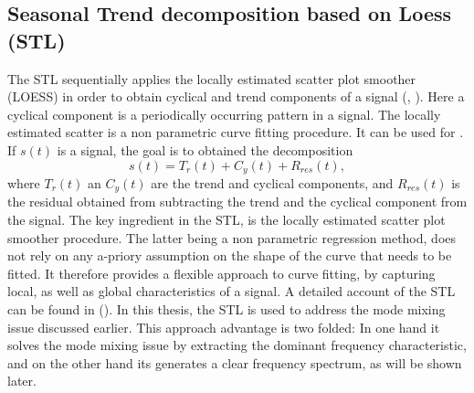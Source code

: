 \documentclass[../Main/thesis.tex]{subfiles}
\begin{document}
\justify
\subsection{Seasonal Trend decomposition based on Loess (STL)}
The STL sequentially applies the locally estimated scatter plot smoother (LOESS) in order to obtain cyclical and trend components of a signal (\cite{Cleveland-1979}, \cite{Cleveland-et-al-1988}). Here a cyclical component is a periodically occurring pattern in a signal. The  locally estimated scatter is a non parametric curve fitting procedure.  It can be used for .
If $s(t)$ is a signal, the goal is to obtained the decomposition 
\begin{equation}
s(t) = T_{r}(t) + C_{y}(t) + R_{res}(t),
\end{equation} 
where $T_{r}(t)$ an $C_{y}(t)$ are the trend and cyclical components, and $R_{res}(t)$ is the residual obtained from subtracting  the trend and the cyclical component from the signal. The key ingredient in the STL, is the locally estimated scatter plot smoother procedure. The latter being a non parametric regression method, does not rely on any a-priory assumption on the shape of the curve that needs to be fitted. It therefore provides a flexible approach to curve fitting, by capturing local, as well as global characteristics of a signal. A detailed account of the STL can be found in  (\cite{Cleveland-et-al-1990}).
\justify
 In this thesis, the STL is used to address the mode mixing issue discussed earlier. This approach advantage is two folded: In one hand it solves the mode mixing issue by extracting the dominant frequency characteristic, and on the other hand its generates a clear frequency spectrum, as will be shown later.
\end{document}
